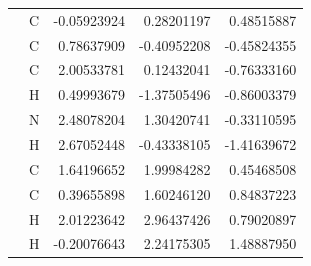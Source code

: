 \begin{longtable}{llrrr}
 & C & -0.05923924 &  0.28201197 &  0.48515887 \\
 & C &  0.78637909 & -0.40952208 & -0.45824355 \\
 & C &  2.00533781 &  0.12432041 & -0.76333160 \\
 & H &  0.49993679 & -1.37505496 & -0.86003379 \\
 & N &  2.48078204 &  1.30420741 & -0.33110595 \\
 & H &  2.67052448 & -0.43338105 & -1.41639672 \\
 & C &  1.64196652 &  1.99984282 &  0.45468508 \\
 & C &  0.39655898 &  1.60246120 &  0.84837223 \\
 & H &  2.01223642 &  2.96437426 &  0.79020897 \\
 & H & -0.20076643 &  2.24175305 &  1.48887950 \\
\end{longtable}
